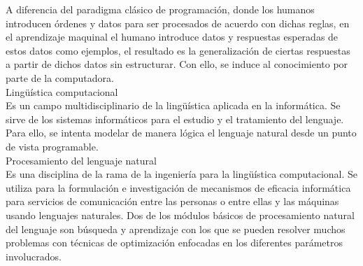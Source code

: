 A diferencia del paradigma clásico de programación, donde los humanos introducen órdenes y datos para ser procesados de acuerdo con dichas reglas, en el aprendizaje maquinal el humano introduce datos y respuestas esperadas de estos datos como ejemplos, el resultado es la generalización de ciertas respuestas a partir de dichos datos sin estructurar. Con ello, se induce al conocimiento por parte de la computadora.\\


Lingüística computacional\\
Es un campo multidisciplinario de la lingüística aplicada en la informática. Se sirve de los sistemas informáticos para el estudio y el tratamiento del lenguaje. Para ello, se intenta modelar de manera lógica el lenguaje natural desde un punto de vista programable.\\

Procesamiento del lenguaje natural\\
Es una disciplina de la rama de la ingeniería para la lingüística computacional. Se utiliza para la formulación e investigación de mecanismos de eficacia informática para servicios de comunicación entre las personas o entre ellas y las máquinas usando lenguajes naturales. Dos de los módulos básicos de procesamiento natural del lenguaje son búsqueda y aprendizaje con los que se pueden resolver muchos problemas con técnicas de optimización enfocadas en los diferentes parámetros involucrados.